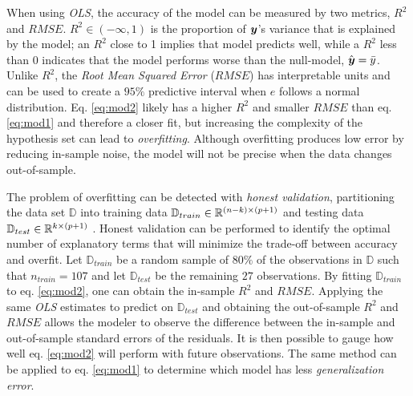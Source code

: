 \documentclass[12pt]{article}
\begin{document}
When using \emph{OLS}, the accuracy of the model can be measured by two metrics, $R^2$ and $RMSE$. $R^2 \in (-\infty, 1)$ is the proportion of $\boldsymbol{y}$'s variance that is explained by the model; an $R^2$ close to 1 implies that model predicts well, while a $R^2$ less than $0$ indicates that the model performs worse than the null-model, $\hat{\boldsymbol{y}} = \bar{y}$. Unlike $R^2$, the \emph{Root Mean Squared Error} ($RMSE$) has interpretable units and can be used to create a $95\%$ predictive interval when $e$ follows a normal distribution. Eq. \ref{eq:mod2} likely has a higher $R^2$ and smaller $RMSE$ than eq. \ref{eq:mod1} and therefore a closer fit, but increasing the complexity of the hypothesis set can lead to \emph{overfitting}. 
Although overfitting produces low error by reducing in-sample noise, the model will not be precise when the data changes out-of-sample. 

The problem of overfitting can be detected with \emph{honest validation}, partitioning the data set $\mathbb{D}$ into training data $\mathbb{D}_{train} \in \mathbb{R}^{(n-k) \times (p+1)}$ and testing data $\mathbb{D}_{test} \in \mathbb{R}^{k \times (p+1)}$  \cite[p. 137-141]{learnFromData}. 
Honest validation can be performed to identify the optimal number of explanatory terms that will minimize the trade-off between accuracy and overfit. Let $\mathbb{D}_{train}$ be a random sample of $80\%$ of the observations in $\mathbb{D}$ such that $n_{train} = 107$ and let $\mathbb{D}_{test}$ be the remaining $27$ observations. By fitting $\mathbb{D}_{train}$ to eq. \ref{eq:mod2}, one can obtain the in-sample $R^2$ and $RMSE$. Applying the same \emph{OLS} estimates to predict on $\mathbb{D}_{test}$ and obtaining the out-of-sample $R^2$ and $RMSE$ allows the modeler to observe the difference between the in-sample and out-of-sample standard errors of the residuals. It is then possible to gauge how well eq. \ref{eq:mod2} will perform with future observations. The same method can be applied to eq. \ref{eq:mod1} to determine which model has less \emph{generalization error}. 
\end{document}
